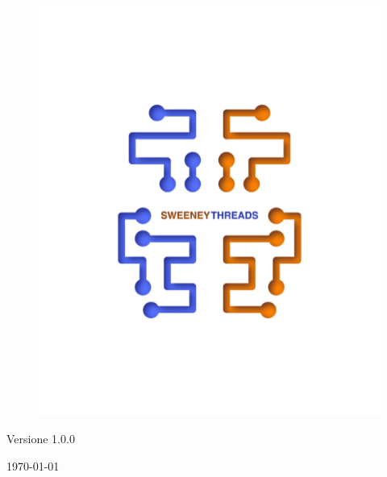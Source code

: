 \documentclass[a4paper]{article}
\begin{document}
\begin{titlepage}
		\begin{figure}[H]
			\centering
			\includegraphics[scale=0.8]{sweeney.png}
		\end{figure}
		\begin{center}
			Versione 1.0.0
		\end{center}
		{\large \today}\\[3cm] 
		\vfill  
	\end{titlepage}
	
	
	\tableofcontents
	
	\newpage 
\end{document}
